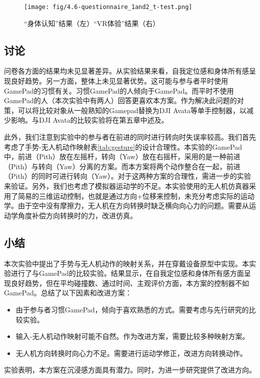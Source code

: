 \begin{figure}[t]
    \centering
    \texttt{[image: fig/4.6-questionnaire\_1and2\_t-test.png]}
    \caption{\label{fig:5.4-1-result-Q1Q2}“身体认知”结果（左）“VR体验”结果（右）}
\end{figure}

\subsection{讨论}

问卷各方面的结果均未见显著差异。从实验结果来看，自我定位感和身体所有感呈现良好趋势。另一方面，整体上未见显著优势。这可能与参与者平时使用GamePad的习惯有关。习惯GamePad的人倾向于GamePad。而平时不使用GamePad的人（本次实验中有两人）回答更喜欢本方案。作为解决此问题的对策，可以将比较对象从一般熟知的Gamepad替换为DJI Avata等单手控制器，以减少影响。与DJI Avata的比较实验将在第五章中述及。

此外，我们注意到实验中的参与者在前进的同时进行转向时失误率较高。我们首先考虑了手势-无人机动作映射表\ref{tab:gesture}的设计合理性。本实验的GamePad中，前进（Pith）放在左摇杆，转向（Yaw）放在右摇杆，采用的是一种前进（Pith）与转向（Yaw）分离的方案。而本方案将两个动作整合在一起，前进（Pith）的同时可进行转向（Yaw）。对于这两种方案的合理性，需进一步的实验来验证。另外，我们也考虑了模拟器运动学的不足。本实验使用的无人机仿真器采用了简易的三维运动控制，也就是通过方向+位移来控制，未充分考虑实际的运动学。由于空中没有摩擦力，无人机在方向转换时缺乏横向向心力的问题。需要从运动学角度补偿方向转换时的力，改进仿真。

\subsection{小结}

本次实验中提出了手势与无人机动作的映射关系，并在穿戴设备原型中实现。本实验进行了与GamePad的比较实验。结果显示，在自我定位感和身体所有感方面呈现良好趋势，但在平均碰撞数、通过时间、主观评价方面，本方案的控制器不如GamePad。总结了以下因素和改进方案：

\begin{itemize}
    \item 由于参与者习惯GamePad，倾向于喜欢熟悉的方式。需要考虑与先行研究的比较实验。
    \item 输入-无人机动作映射可能不自然。作为改进方案，需要比较多种映射方案。
    \item 无人机方向转换时向心力不足。需要进行运动学修正，改进方向转换动作。
\end{itemize}

实验表明，本方案在沉浸感方面具有潜力。同时，为进一步研究提供了改进方向。

\ifx\allfiles\undefined

\fi
